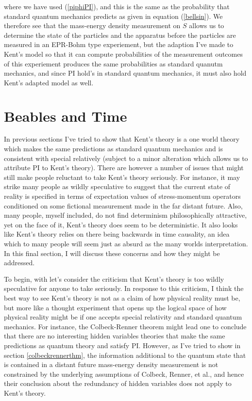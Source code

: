 where we have used (\ref{piphiPI}), and this is the same as the probability that standard quantum mechanics predicts as given in equation (\ref{bellsin}). We therefore see that the mass-energy density measurement on $S$ allows us to determine the state of the particles and the apparatus before the particles are measured in an EPR-Bohm type experiement, but the adaption I've made to Kent's model so that it can compute probabilities of the measurement outcomes of this experiement produces the same probabilities as standard quanutm mechanics, and since PI hold's in standard quantum mechanics, it must also hold Kent's adapted model as well.\label{kentpiend}



\section{Beables and Time}
In previous sections I've tried to show that Kent's theory is a one world theory which makes the same predictions as standard quantum mechanics and is consistent with special relatively (subject to a minor alteration which allows us to attribute PI to Kent's theory). There are however a number of issues that might still make people reluctant to take Kent's theory seriously. For instance, it may strike many people as wildly speculative to suggest that the current state of reality is specified in terms of expectation values of stress-momentum operators conditioned on some fictional measurement made in the far distant future. Also, many people, myself included, do not find determinism philosophically attractive, yet on the face of it, Kent's theory does seem to be deterministic. It also looks like Kent's theory relies on there being backwards in time causality, an idea which to many people will seem just as absurd as the many worlds interpretation. In this final section, I will discuss these concerns and how they might be addressed.

To begin, with let's consider the criticism that Kent's theory is too wildly speculative for anyone to take seriously. In response to this criticism, I think the best way to see Kent's theory is not as a claim of how physical reality must be, but more like a thought experiment that opens up the logical space of how physical reality might be if one accepts special relativity and standard quantum mechanics. For instance, the Colbeck-Renner theorem might lead one to conclude that there are no interesting hidden variables theories that make the same predictions as quantum theory and satisfy PI. However, as I've tried to show in section \ref{colbeckrennerthm}, the information additional to the quantum state that is contained in a distant future mass-energy density measurement is not constrained by the underlying assumptions of Colbeck, Renner, et al., and hence their conclusion about the redundancy of hidden variables does not apply to Kent's theory. 

